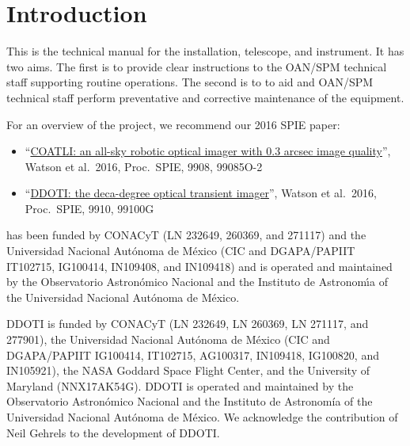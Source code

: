 \chapter{Introduction}
\label{chapter:introduction}

This is the technical manual for the {\projectname} installation, telescope, and instrument. It has two aims. The first is to provide clear instructions to the OAN/SPM technical staff supporting routine operations. The second is to to aid {\projectname} and OAN/SPM technical staff perform preventative and corrective maintenance of the equipment.

For an overview of the {\projectname} project, we recommend our 2016 SPIE paper:

\ifcoatlioan
\begin{itemize}
\item “\href{bibliography/spie-coatli-2016.pdf}{COATLI: an all-sky robotic optical imager with 0.3 arcsec image quality}”, Watson et al.\ 2016, Proc.\ SPIE, 9908, 99085O-2
\end{itemize}
\fi

\ifddotioan
\begin{itemize}
\item “\href{bibliography/spie-ddoti-2016.pdf}{DDOTI: the deca-degree optical transient imager}”, Watson et al.\ 2016, Proc.\ SPIE, 9910, 99100G
\end{itemize}
\fi

\ifcoatlioan
{\projectname} has been funded by CONACyT (LN 232649, 260369, and 271117)
and the Universidad Nacional Aut\'onoma de M\'exico (CIC and
DGAPA/PAPIIT IT102715, IG100414, IN109408, and IN109418) and is operated and
maintained by the Observatorio Astron\'omico Nacional and the Instituto
de Astronom{\'\i}a of the Universidad Nacional Aut\'onoma de M\'exico.
\fi

\ifddotioan
DDOTI is funded by CONACyT (LN 232649, LN 260369, LN 271117, and 277901), the Universidad Nacional Autónoma de México (CIC and DGAPA/PAPIIT IG100414, IT102715, AG100317, IN109418, IG100820, and IN105921), the NASA Goddard Space Flight Center, and the University of Maryland (NNX17AK54G). DDOTI is operated and maintained by the Observatorio Astronómico Nacional and the Instituto de Astronomía of the Universidad Nacional Autónoma de México. We acknowledge the contribution of Neil Gehrels to the development of DDOTI.
\fi